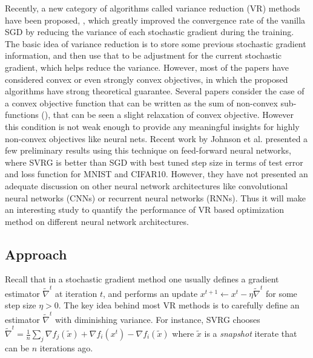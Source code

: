 \documentclass{article} %
\begin{document}
Recently, a new category of algorithms called variance reduction (VR) methods have been proposed, \cite{JohnsonZhang2013-SVRG,Shalev-Shwartz2013-SDCA,Schmidt2013-SAG,Shalev-ShwartzZhang2014-ProxSDCA,XiaoZhang2014-ProximalSVRG,Defazio2014-Finito,Defazio2014-SAGA,Mairal2015-MISO,UniVR, exploitingstructure}, which greatly improved the convergence rate of the vanilla SGD by reducing the variance of each stochastic gradient
during the training. The basic idea of variance reduction is to store some previous stochastic gradient information, and then use that to be adjustment for the current stochastic gradient, which helps reduce the variance.
However, most of the papers have considered convex or even strongly convex objectives, in which the proposed algorithms have strong theoretical guarantee. Several papers consider the case of a convex objective function that can be written as the sum of non-convex sub-functions (\cite{Shalev-Shwartz2015-SDCAwithoutDual,UniVR}), that can be seen a slight relaxation of convex objective. However this condition is not weak enough to provide any meaningful insights for highly non-convex objectives like neural nets. Recent work by Johnson et al.  \cite{JohnsonZhang2013-SVRG} presented a few preliminary results using this technique on feed-forward neural networks, where SVRG is better than SGD with best tuned step size in terms of test error and loss function for MNIST and CIFAR10. However, they have not presented an adequate discussion on other neural network architectures like convolutional neural networks (CNNs) or recurrent neural networks (RNNs). Thus it will make an interesting study to quantify the performance of VR based optimization method on different neural network architectures. 

\subsection{Approach}

\newcommand{\tnabla}{\tilde{\nabla}}
\newcommand{\tx}{\tilde{x}}
\newcommand{\bx}{\bar{x}}
\newcommand{\lt}{\mathsf{lt}}
\newcommand{\li}{\mathsf{li}}
\newcommand{\cH}{H_{\mathsf{cl}}}

Recall that in a stochastic gradient method one usually defines a gradient estimator $\tnabla^t$ at iteration $t$, and performs an update $x^{t+1} \gets x^t - \eta \tnabla^t$ for some step size $\eta>0$.
The key idea behind most VR methods is to carefully define an estimator $\tnabla^t$ with diminishing variance. For instance, SVRG chooses $\tnabla^t = \frac{1}{n} \sum_j \nabla f_j(\tx) + \nabla f_i(x^t) - \nabla f_i(\tx)$ where $\tx$ is a \emph{snapshot} iterate that can be $n$ iterations ago.
\end{document}
